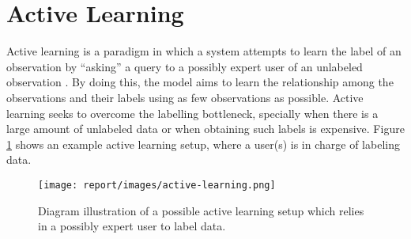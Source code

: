 \section{Active Learning} \label{sect:theory:active-learning}

Active learning is a paradigm in which a system attempts to learn the label of an observation by ``asking'' a query to a possibly expert user of an unlabeled observation \cite{report:active-learning}. By doing this, the model aims to learn the relationship among the observations and their labels using as few observations as possible. Active learning seeks to overcome the labelling bottleneck, specially when there is a large amount of unlabeled data or when obtaining such labels is expensive. Figure \ref{fig:active-learning} shows an example active learning setup, where a user(s) is in charge of labeling data.

\begin{figure}[H]
  \centering
  \texttt{[image: report/images/active-learning.png]}
  \caption{Diagram illustration of a possible active learning setup which relies in a possibly expert user to label data.}
  \label{fig:active-learning}
\end{figure}